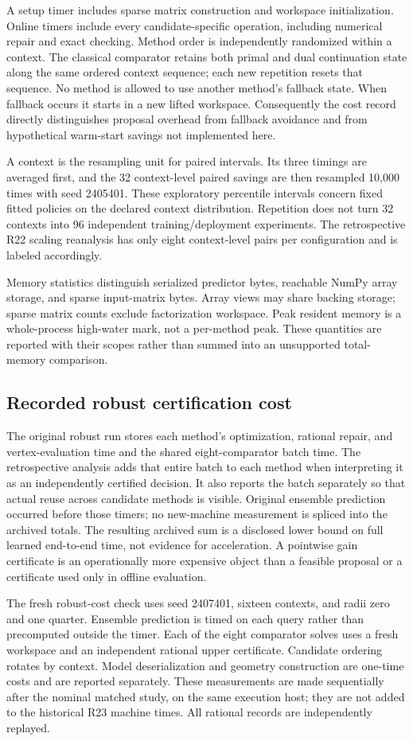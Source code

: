 A setup timer includes sparse matrix construction and workspace initialization.
Online timers include every candidate-specific operation, including numerical
repair and exact checking. Method order is independently randomized within a
context. The classical comparator retains both primal and dual continuation
state along the same ordered context sequence; each new repetition resets that
sequence. No method is allowed to use another method's fallback state. When
fallback occurs it starts in a new lifted workspace. Consequently the cost
record directly distinguishes proposal overhead from fallback avoidance and
from hypothetical warm-start savings not implemented here.

A context is the resampling unit for paired intervals. Its three timings are
averaged first, and the 32 context-level paired savings are then resampled
10,000 times with seed 2405401. These exploratory percentile intervals concern
fixed fitted policies on the declared context distribution. Repetition does
not turn 32 contexts into 96 independent training/deployment experiments.
The retrospective R22 scaling reanalysis has only eight context-level pairs
per configuration and is labeled accordingly.

Memory statistics distinguish serialized predictor bytes, reachable NumPy
array storage, and sparse input-matrix bytes. Array views may share backing
storage; sparse matrix counts exclude factorization workspace. Peak resident
memory is a whole-process high-water mark, not a per-method peak. These
quantities are reported with their scopes rather than summed into an
unsupported total-memory comparison.

\subsection{Recorded robust certification cost}
The original robust run stores each method's optimization, rational repair,
and vertex-evaluation time and the shared eight-comparator batch time. The
retrospective analysis adds that entire batch to each method when interpreting
it as an independently certified decision. It also reports the batch
separately so that actual reuse across candidate methods is visible. Original
ensemble prediction occurred before those timers; no new-machine measurement
is spliced into the archived totals. The resulting archived sum is a disclosed
lower bound on full learned end-to-end time, not evidence for acceleration.
A pointwise gain certificate is an operationally more expensive object than a
feasible proposal or a certificate used only in offline evaluation.



The fresh robust-cost check uses seed 2407401, sixteen contexts, and radii zero
and one quarter. Ensemble prediction is timed on each query rather than
precomputed outside the timer. Each of the eight comparator solves uses a
fresh workspace and an independent rational upper certificate. Candidate
ordering rotates by context. Model deserialization and geometry construction
are one-time costs and are reported separately. These measurements are made
sequentially after the nominal matched study, on the same execution host;
they are not added to the historical R23 machine times. All rational records
are independently replayed.
